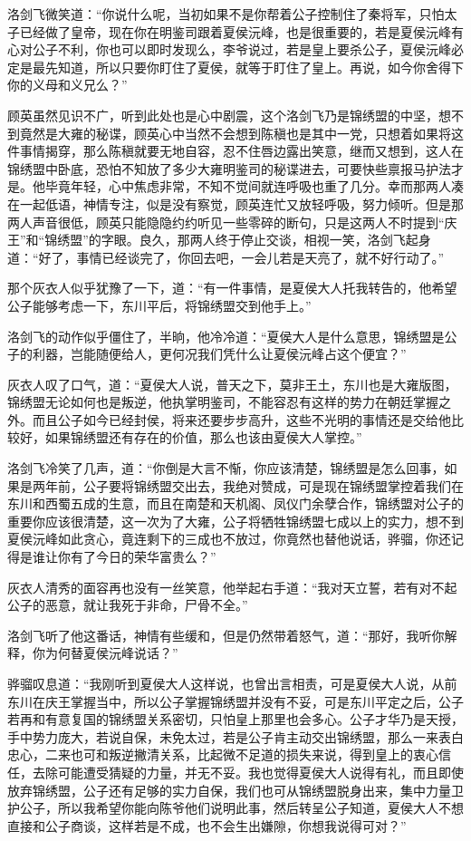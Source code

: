 洛剑飞微笑道：“你说什么呢，当初如果不是你帮着公子控制住了秦将军，只怕太子已经做了皇帝，现在你在明鉴司跟着夏侯沅峰，也是很重要的，若是夏侯沅峰有心对公子不利，你也可以即时发现么，李爷说过，若是皇上要杀公子，夏侯沅峰必定是最先知道，所以只要你盯住了夏侯，就等于盯住了皇上。再说，如今你舍得下你的义母和义兄么？”

顾英虽然见识不广，听到此处也是心中剧震，这个洛剑飞乃是锦绣盟的中坚，想不到竟然是大雍的秘谍，顾英心中当然不会想到陈稹也是其中一党，只想着如果将这件事情揭穿，那么陈稹就要无地自容，忍不住唇边露出笑意，继而又想到，这人在锦绣盟中卧底，恐怕不知放了多少大雍明鉴司的秘谍进去，可要快些禀报马护法才是。他毕竟年轻，心中焦虑非常，不知不觉间就连呼吸也重了几分。幸而那两人凑在一起低语，神情专注，似是没有察觉，顾英连忙又放轻呼吸，努力倾听。但是那两人声音很低，顾英只能隐隐约约听见一些零碎的断句，只是这两人不时提到“庆王”和“锦绣盟”的字眼。良久，那两人终于停止交谈，相视一笑，洛剑飞起身道：“好了，事情已经谈完了，你回去吧，一会儿若是天亮了，就不好行动了。”

那个灰衣人似乎犹豫了一下，道：“有一件事情，是夏侯大人托我转告的，他希望公子能够考虑一下，东川平后，将锦绣盟交到他手上。”

洛剑飞的动作似乎僵住了，半晌，他冷冷道：“夏侯大人是什么意思，锦绣盟是公子的利器，岂能随便给人，更何况我们凭什么让夏侯沅峰占这个便宜？”

灰衣人叹了口气，道：“夏侯大人说，普天之下，莫非王土，东川也是大雍版图，锦绣盟无论如何也是叛逆，他执掌明鉴司，不能容忍有这样的势力在朝廷掌握之外。而且公子如今已经封侯，将来还要步步高升，这些不光明的事情还是交给他比较好，如果锦绣盟还有存在的价值，那么也该由夏侯大人掌控。”

洛剑飞冷笑了几声，道：“你倒是大言不惭，你应该清楚，锦绣盟是怎么回事，如果是两年前，公子要将锦绣盟交出去，我绝对赞成，可是现在锦绣盟掌控着我们在东川和西蜀五成的生意，而且在南楚和天机阁、凤仪门余孽合作，锦绣盟对公子的重要你应该很清楚，这一次为了大雍，公子将牺牲锦绣盟七成以上的实力，想不到夏侯沅峰如此贪心，竟连剩下的三成也不放过，你竟然也替他说话，骅骝，你还记得是谁让你有了今日的荣华富贵么？”

灰衣人清秀的面容再也没有一丝笑意，他举起右手道：“我对天立誓，若有对不起公子的恶意，就让我死于非命，尸骨不全。”

洛剑飞听了他这番话，神情有些缓和，但是仍然带着怒气，道：“那好，我听你解释，你为何替夏侯沅峰说话？”

骅骝叹息道：“我刚听到夏侯大人这样说，也曾出言相责，可是夏侯大人说，从前东川在庆王掌握当中，所以公子掌握锦绣盟并没有不妥，可是东川平定之后，公子若再和有意复国的锦绣盟关系密切，只怕皇上那里也会多心。公子才华乃是天授，手中势力庞大，若说自保，未免太过，若是公子肯主动交出锦绣盟，那么一来表白忠心，二来也可和叛逆撇清关系，比起微不足道的损失来说，得到皇上的衷心信任，去除可能遭受猜疑的力量，并无不妥。我也觉得夏侯大人说得有礼，而且即使放弃锦绣盟，公子还有足够的实力自保，我们也可从锦绣盟脱身出来，集中力量卫护公子，所以我希望你能向陈爷他们说明此事，然后转呈公子知道，夏侯大人不想直接和公子商谈，这样若是不成，也不会生出嫌隙，你想我说得可对？”

